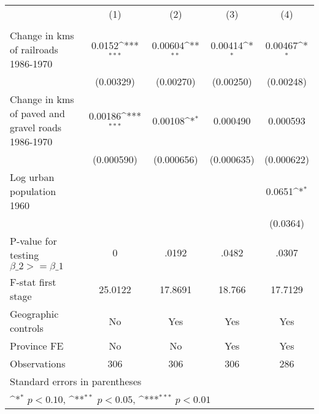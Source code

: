 {
\def\sym#1{\ifmmode^{#1}\else\(^{#1}\)\fi}
\begin{tabular}{l*{4}{c}}
\hline\hline
                &\multicolumn{1}{c}{(1)}&\multicolumn{1}{c}{(2)}&\multicolumn{1}{c}{(3)}&\multicolumn{1}{c}{(4)}\\
                &\multicolumn{1}{c}{}&\multicolumn{1}{c}{}&\multicolumn{1}{c}{}&\multicolumn{1}{c}{}\\
\hline
Change in kms of railroads 1986-1970&   0.0152\sym{***}&  0.00604\sym{**} &  0.00414\sym{*}  &  0.00467\sym{*}  \\
                &(0.00329)         &(0.00270)         &(0.00250)         &(0.00248)         \\
[1em]
Change in kms of paved and gravel roads 1986-1970&  0.00186\sym{***}&  0.00108\sym{*}  & 0.000490         & 0.000593         \\
                &(0.000590)         &(0.000656)         &(0.000635)         &(0.000622)         \\
[1em]
Log urban population 1960&                  &                  &                  &   0.0651\sym{*}  \\
                &                  &                  &                  & (0.0364)         \\
\hline
P-value for testing $\beta\_{2} >= \beta\_{1}$&        0         &    .0192         &    .0482         &    .0307         \\
F-stat first stage&  25.0122         &  17.8691         &   18.766         &  17.7129         \\
Geographic controls&       No         &      Yes         &      Yes         &      Yes         \\
Province FE     &       No         &       No         &      Yes         &      Yes         \\
Observations    &      306         &      306         &      306         &      286         \\
\hline\hline
\multicolumn{5}{l}{\footnotesize Standard errors in parentheses}\\
\multicolumn{5}{l}{\footnotesize \sym{*} \(p<0.10\), \sym{**} \(p<0.05\), \sym{***} \(p<0.01\)}\\
\end{tabular}
}
